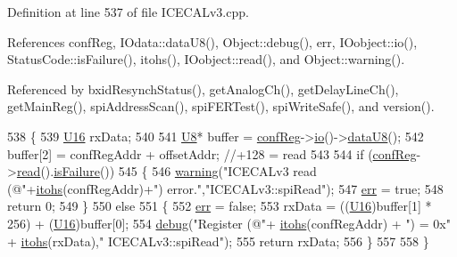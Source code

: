 Definition at line 537 of file I\+C\+E\+C\+A\+Lv3.\+cpp.



References conf\+Reg, I\+Odata\+::data\+U8(), Object\+::debug(), err, I\+Oobject\+::io(), Status\+Code\+::is\+Failure(), itohs(), I\+Oobject\+::read(), and Object\+::warning().



Referenced by bxid\+Resynch\+Status(), get\+Analog\+Ch(), get\+Delay\+Line\+Ch(), get\+Main\+Reg(), spi\+Address\+Scan(), spi\+F\+E\+R\+Test(), spi\+Write\+Safe(), and version().


\begin{DoxyCode}
538 \{
539     \hyperlink{ICECALv3_8h_adf928e51a60dba0df29d615401cc55a8}{U16} rxData;
540 
541     \hyperlink{ICECALv3_8h_a3cb25ca6f51f003950f9625ff05536fc}{U8}* buffer = \hyperlink{classICECALv3_a6e8b6c03f5b0f1d8281bf8a0fa46064f}{confReg}->\hyperlink{classIOobject_af04fb94137c3d86849f478ac5afab5d1}{io}()->\hyperlink{classIOdata_a75e9c318dbac3a39402179070943d4bc}{dataU8}();
542     buffer[2]  = confRegAddr + offsetAddr;                          \textcolor{comment}{//+128 = read   }
543 
544     \textcolor{keywordflow}{if} (\hyperlink{classICECALv3_a6e8b6c03f5b0f1d8281bf8a0fa46064f}{confReg}->\hyperlink{classIOobject_aa07610c11963b1db6710e3c76ceea456}{read}().\hyperlink{classStatusCode_a5dd22dc6eb2c52fc4cabc58f6dea2eb7}{isFailure}()) 
545     \{
546         \hyperlink{classObject_a65cd4fda577711660821fd2cd5a3b4c9}{warning}(\textcolor{stringliteral}{"ICECALv3 read (@"}+\hyperlink{classICECALv3_a04b02e583f191bfce34d05132cd23834}{itohs}(confRegAddr)+\textcolor{stringliteral}{") error."},\textcolor{stringliteral}{"ICECALv3::spiRead"});
547         \hyperlink{classICECALv3_ad8989925ee5b3ff322d863ce6aaff0bd}{err} = \textcolor{keyword}{true};
548         \textcolor{keywordflow}{return} 0;
549     \}
550     \textcolor{keywordflow}{else}
551     \{
552         \hyperlink{classICECALv3_ad8989925ee5b3ff322d863ce6aaff0bd}{err} = \textcolor{keyword}{false};
553         rxData = ((\hyperlink{ICECALv3_8h_adf928e51a60dba0df29d615401cc55a8}{U16})buffer[1] * 256) + (\hyperlink{ICECALv3_8h_adf928e51a60dba0df29d615401cc55a8}{U16})buffer[0];
554         \hyperlink{classObject_aac010553f022165573714b7014a15f0d}{debug}(\textcolor{stringliteral}{"Register (@"}+ \hyperlink{classICECALv3_a04b02e583f191bfce34d05132cd23834}{itohs}(confRegAddr) + \textcolor{stringliteral}{") = 0x"} + \hyperlink{classICECALv3_a04b02e583f191bfce34d05132cd23834}{itohs}(rxData),\textcolor{stringliteral}{"
      ICECALv3::spiRead"});
555         \textcolor{keywordflow}{return} rxData;
556     \}
557 
558 \}
\end{DoxyCode}
\mbox{\label{classICECALv3_aef00f02801dea4bda2093c930501dcdd}} 
